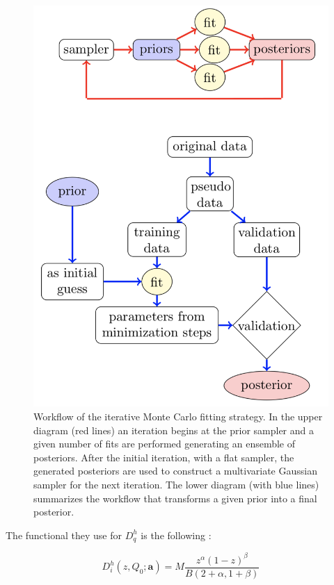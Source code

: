 \begin{figure}[!h]
  \centering
	\includegraphics[scale=0.45]{./gfx/IMC.png}
	\caption{Workflow of the iterative Monte Carlo fitting strategy. In the upper diagram (red lines) an iteration begins at the prior sampler and a given number of fits are performed generating an ensemble of posteriors. After the initial iteration, with a flat sampler, the generated posteriors are used to construct a multivariate Gaussian sampler for the next iteration. The lower diagram (with blue lines) summarizes the workflow that transforms a given prior into a final posterior.}
	\label{pic:IMC}
\end{figure}


The functional they use for $D^h_q$ is the following :

\begin{equation}
  D^h_i (z,Q_0;\textbf{a}) = M \frac{z^{\alpha}(1-z)^{\beta}}{B(2+\alpha,1+\beta)}
  \label{eq:JAMparam}
\end{equation}

